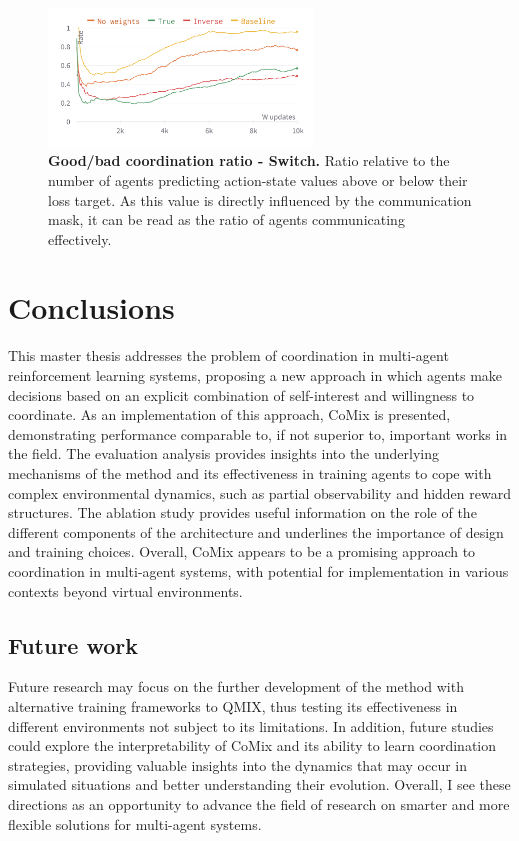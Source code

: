 \documentclass[a4paper,singleside,12pt]{report} %
\begin{document}
  \begin{figure}
    \centering
    \includegraphics[width=7cm]{images/ablation_comm_ratio.png}
    \caption{\textbf{Good/bad coordination ratio - Switch.} Ratio relative to the number of agents predicting action-state values above or below their loss target. As this value is directly influenced by the communication mask, it can be read as the ratio of agents communicating effectively.}
    \label{fig:ablation-comm}
  \end{figure}

\section{Conclusions}\label{conclusions}
This master thesis addresses the problem of coordination in multi-agent reinforcement learning systems, proposing a new approach in which agents make decisions based on an explicit combination of self-interest and willingness to coordinate. As an implementation of this approach, CoMix is presented, demonstrating performance comparable to, if not superior to, important works in the field. The evaluation analysis provides insights into the underlying mechanisms of the method and its effectiveness in training agents to cope with complex environmental dynamics, such as partial observability and hidden reward structures. The ablation study provides useful information on the role of the different components of the architecture and underlines the importance of design and training choices.
Overall, CoMix appears to be a promising approach to coordination in multi-agent systems, with potential for implementation in various contexts beyond virtual environments.

\subsection{Future work}\label{limitations}
Future research may focus on the further development of the method with alternative training frameworks to QMIX, thus testing its effectiveness in different environments not subject to its limitations. In addition, future studies could explore the interpretability of CoMix and its ability to learn coordination strategies, providing valuable insights into the dynamics that may occur in simulated situations and better understanding their evolution. Overall, I see these directions as an opportunity to advance the field of research on smarter and more flexible solutions for multi-agent systems.
\end{document}
